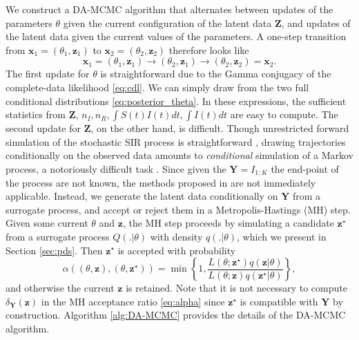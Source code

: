 \documentclass[12pt]{article}
\begin{document}
We construct a DA-MCMC algorithm that alternates between updates of the parameters $\theta$ given the current configuration of the latent data $\mathbf{Z}$, and updates of the latent data given the current values of the parameters. A one-step transition from $\mathbf{x}_1 = (\theta_1, \mathbf{z}_1)$ to $\mathbf{x}_2 = (\theta_2, \mathbf{z}_2)$ therefore looks like
$$\mathbf{x}_1 = (\theta_1, \mathbf{z}_1) \rightarrow (\theta_2, \mathbf{z}_1) \rightarrow (\theta_2, \mathbf{z}_2) = \mathbf{x}_2.$$
The first update for $\theta$ is straightforward due to the Gamma conjugacy of the complete-data likelihood \eqref{eq:cdl}. We can simply draw from the two full conditional distributions \eqref{eq:posterior_theta}. In these expressions, the sufficient statistics from $\mathbf{Z}$, $n_I, n_R, \int S(t)I(t) dt, \int I(t) dt$ are easy to compute.
The second update for $\mathbf{Z}$, on the other hand, is difficult. Though unrestricted forward simulation of the stochastic SIR process is straightforward \cite{Gillespie.1977}, drawing trajectories conditionally on the observed data amounts to \textit{conditional} simulation of a Markov process, a notoriously difficult task \cite{Hobolth.2009}. Since given the $\mathbf{Y} = I_{1:K}$ the end-point of the process are not known, the methods proposed in \cite{Hobolth.2009} are not immediately applicable.
Instead, we generate the latent data conditionally on $\mathbf{Y}$ from a surrogate process, and accept or reject them in a Metropolis-Hastings (MH) step. Given some current $\theta$ and $\mathbf{z}$, the MH step proceeds by simulating a candidate $\mathbf{z}^\star$ from a surrogate process $Q(.|\theta)$ with density $q(.|\theta)$, which we present in Section \ref{sec:pds}. Then $\mathbf{z}^\star$ is accepted with probability
\begin{equation}
	\label{eq:alpha}
	\alpha\left( \left( \theta, \mathbf{z}\right) , \left( \theta, \mathbf{z}^\star\right) \right) =	\min\left\lbrace 1, \dfrac{L\left( \theta; \mathbf{z}^\star\right) q\left( \mathbf{z}|\theta\right)}{L\left( \theta;\mathbf{z}\right) q\left( \mathbf{z}^\star|\theta\right)}\right\rbrace,
\end{equation}
and otherwise the current $\mathbf{z}$ is retained. Note that it is not necessary to compute $\delta_{\mathbf{Y}}(\mathbf{z})$ in the MH acceptance ratio \eqref{eq:alpha} since $\mathbf{z}^\star$ is compatible with $\mathbf{Y}$ by construction. Algorithm \ref{alg:DA-MCMC} provides the details of the DA-MCMC algorithm.
\end{document}

